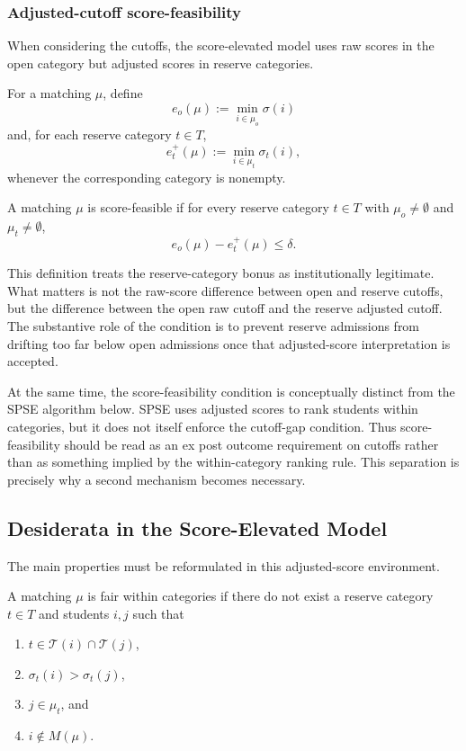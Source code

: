 \documentclass[runningheads]{llncs}
\newcommand{\T}{\mathcal{T}}
\newcommand{\1}{\mathbf{1}}
\begin{document}
\subsubsection{Adjusted-cutoff score-feasibility}

When considering the cutoffs, the score-elevated model uses raw scores in the open category but adjusted scores in reserve categories.

\begin{definition}
For a matching $\mu$, define
\[
e_o(\mu):=\min_{i\in\mu_o}\sigma(i)
\]
and, for each reserve category $t\in T$,
\[
e_t^+(\mu):=\min_{i\in\mu_t}\sigma_t(i),
\]
whenever the corresponding category is nonempty.
\end{definition}

\begin{definition}
A matching $\mu$ is score-feasible if for every reserve category $t\in T$ with $\mu_o\neq\emptyset$ and $\mu_t\neq\emptyset$,
\[
e_o(\mu)-e_t^+(\mu)\le \delta.
\]
\end{definition}

This definition treats the reserve-category bonus as institutionally legitimate. What matters is not the raw-score difference between open and reserve cutoffs, but the difference between the open raw cutoff and the reserve adjusted cutoff. The substantive role of the condition is to prevent reserve admissions from drifting too far below open admissions once that adjusted-score interpretation is accepted.

At the same time, the score-feasibility condition is conceptually distinct from the SPSE algorithm below. SPSE uses adjusted scores to rank students within categories, but it does not itself enforce the cutoff-gap condition. Thus score-feasibility should be read as an ex post outcome requirement on cutoffs rather than as something implied by the within-category ranking rule. This separation is precisely why a second mechanism becomes necessary.

\subsection{Desiderata in the Score-Elevated Model}

The main properties must be reformulated in this adjusted-score environment.

\begin{definition}
A matching $\mu$ is fair within categories if there do not exist a reserve category $t\in T$ and students $i,j$ such that
\begin{enumerate}
\item $t\in\T(i)\cap\T(j)$,
\item $\sigma_t(i)>\sigma_t(j)$,
\item $j\in\mu_t$, and
\item $i\notin M(\mu)$.
\end{enumerate}
\end{definition}
\end{document}
